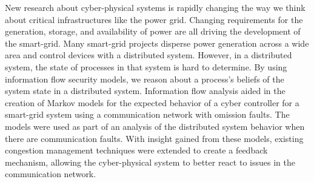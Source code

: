 New research about cyber-physical systems is rapidly changing the way we think about critical infrastructures like the power grid.
Changing requirements for the generation, storage, and availability of power are all driving the development of the smart-grid.
Many smart-grid projects disperse power generation across a wide area and control devices with a distributed system. 
However, in a distributed system, the state of processes in that system is hard to determine.
By using information flow security models, we reason about a process's beliefs of the system state in a distributed system.
Information flow analysis aided in the creation of Markov models for the expected behavior of a cyber controller for a smart-grid system using a communication network with omission faults.
The models were used as part of an analysis of the distributed system behavior when there are communication faults.
With insight gained from these models, existing congestion management techniques were extended to create a feedback mechanism, allowing the cyber-physical system to better react to issues in the communication network.